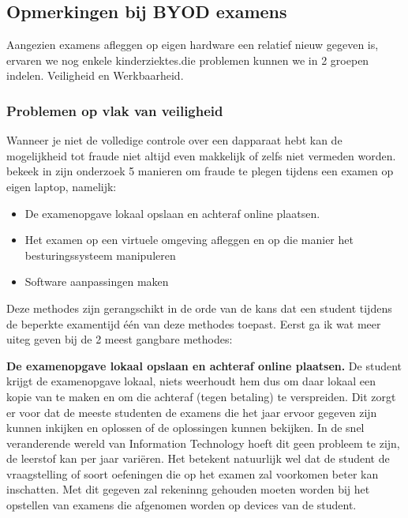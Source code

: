 \subsection{Opmerkingen bij BYOD examens}

Aangezien examens afleggen op eigen hardware een relatief nieuw gegeven is, ervaren we nog enkele kinderziektes.die problemen kunnen we in 2 groepen indelen. Veiligheid en Werkbaarheid.\\ 

\subsubsection{Problemen op vlak van veiligheid}
Wanneer je niet de volledige controle over een dapparaat hebt kan de mogelijkheid tot fraude niet altijd even makkelijk of zelfs niet vermeden worden.
\textcite{Dawson2016} bekeek in zijn onderzoek 5 manieren om fraude te plegen tijdens een examen op eigen laptop, namelijk: 
\begin{itemize}
	\item De examenopgave lokaal opslaan en achteraf online plaatsen.
	\item Het examen op een virtuele omgeving afleggen en op die manier het besturingssysteem manipuleren
	\item Software aanpassingen maken 

\end{itemize}

Deze methodes zijn gerangschikt in de orde van de kans dat een student tijdens de beperkte examentijd \'{e}\'{e}n van deze methodes toepast. Eerst ga ik wat meer uiteg geven bij de 2 meest gangbare methodes: 

\textbf{De examenopgave lokaal opslaan en achteraf online plaatsen.} De student krijgt de examenopgave lokaal, niets weerhoudt hem dus om daar lokaal een kopie van te maken en om die achteraf (tegen betaling) te verspreiden. Dit zorgt er voor dat de meeste studenten de examens die het jaar ervoor gegeven zijn kunnen inkijken en oplossen of de oplossingen kunnen bekijken. In de snel veranderende wereld van Information Technology hoeft dit geen probleem te zijn, de leerstof kan per jaar vari\"{e}ren. Het betekent natuurlijk wel dat de student de vraagstelling of soort oefeningen die op het examen zal voorkomen beter kan inschatten. Met dit gegeven zal rekeninng gehouden moeten worden bij het opstellen van examens die afgenomen worden op devices van de student. 

